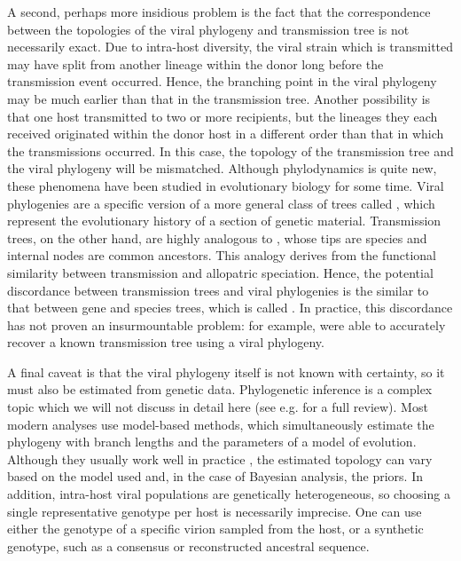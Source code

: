 A second, perhaps more insidious problem is the fact that the correspondence
between the topologies of the viral phylogeny and transmission tree is not
necessarily exact. Due to intra-host diversity, the viral strain which is
transmitted may have split from another lineage within the donor long before
the transmission event occurred. Hence, the branching point in the viral
phylogeny may be much earlier than that in the transmission tree. Another
possibility is that one host transmitted to two or more recipients, but the
lineages they each received originated within the donor host in a different
order than that in which the transmissions occurred. In this case, the topology
of the transmission tree and the viral phylogeny will be mismatched. Although
phylodynamics is quite new, these phenomena have been studied in evolutionary
biology for some time. Viral phylogenies are a specific version of a more
general class of trees called , which represent the
evolutionary history of a section of genetic material. Transmission trees, on
the other hand, are highly analogous to , whose tips are
species and internal nodes are common ancestors. This analogy derives from the
functional similarity between transmission and allopatric speciation. Hence,
the potential discordance between transmission trees and viral phylogenies is
the similar to that between gene and species trees, which is called
. In practice, this discordance has not proven
an insurmountable problem: for example, \textcite{leitner1996accurate} were
able to accurately recover a known transmission tree using a viral phylogeny.

A final caveat is that the viral phylogeny itself is not known with certainty,
so it must also be estimated from genetic data. Phylogenetic inference is a
complex topic which we will not discuss in detail here (see e.g.
\autocite{nei2000molecular} for a full review). Most modern analyses use
model-based methods, which simultaneously estimate the phylogeny with branch
lengths and the parameters of a model of evolution. Although they usually work
well in practice , the estimated topology can vary
based on the model used and, in the case of Bayesian analysis, the priors.  In
addition, intra-host viral populations are genetically heterogeneous, so
choosing a single representative genotype per host is necessarily imprecise.
One can use either the genotype of a specific virion sampled from the host, or
a synthetic genotype, such as a consensus or reconstructed ancestral sequence.

